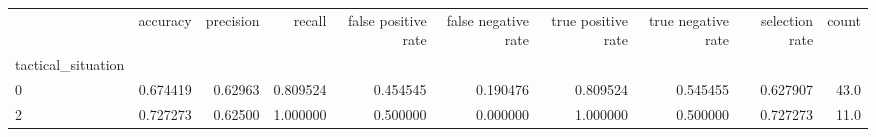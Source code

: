 \begin{tabular}{lrrrrrrrrr}
\toprule
{} &  accuracy &  precision &    recall &  false positive rate &  false negative rate &  true positive rate &  true negative rate &  selection rate &  count \\
tactical\_situation &           &            &           &                      &                      &                     &                     &                 &        \\
\midrule
0                  &  0.674419 &    0.62963 &  0.809524 &             0.454545 &             0.190476 &            0.809524 &            0.545455 &        0.627907 &   43.0 \\
2                  &  0.727273 &    0.62500 &  1.000000 &             0.500000 &             0.000000 &            1.000000 &            0.500000 &        0.727273 &   11.0 \\
\bottomrule
\end{tabular}
